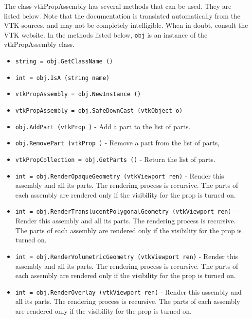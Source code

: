 The class vtkPropAssembly has several methods that can be used.
  They are listed below.
Note that the documentation is translated automatically from the VTK sources,
and may not be completely intelligible.  When in doubt, consult the VTK website.
In the methods listed below, \verb|obj| is an instance of the vtkPropAssembly class.
\begin{itemize}
\item  \verb|string = obj.GetClassName ()|

\item  \verb|int = obj.IsA (string name)|

\item  \verb|vtkPropAssembly = obj.NewInstance ()|

\item  \verb|vtkPropAssembly = obj.SafeDownCast (vtkObject o)|

\item  \verb|obj.AddPart (vtkProp )| -  Add a part to the list of parts.

\item  \verb|obj.RemovePart (vtkProp )| -  Remove a part from the list of parts,

\item  \verb|vtkPropCollection = obj.GetParts ()| -  Return the list of parts.

\item  \verb|int = obj.RenderOpaqueGeometry (vtkViewport ren)| -  Render this assembly and all its parts.  The rendering process is
 recursive. The parts of each assembly are rendered only if the
 visibility for the prop is turned on.

\item  \verb|int = obj.RenderTranslucentPolygonalGeometry (vtkViewport ren)| -  Render this assembly and all its parts.  The rendering process is
 recursive. The parts of each assembly are rendered only if the
 visibility for the prop is turned on.

\item  \verb|int = obj.RenderVolumetricGeometry (vtkViewport ren)| -  Render this assembly and all its parts.  The rendering process is
 recursive. The parts of each assembly are rendered only if the
 visibility for the prop is turned on.

\item  \verb|int = obj.RenderOverlay (vtkViewport ren)| -  Render this assembly and all its parts.  The rendering process is
 recursive. The parts of each assembly are rendered only if the
 visibility for the prop is turned on.


\end{itemize}
